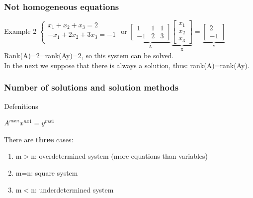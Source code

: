 \begin{frame}
	\frametitle{Not homogeneous equations}
	\begin{block}{Example 2}
		$\begin{cases}
		x_1+x_2+x_3=2\\
		-x_1+2x_2+3x_3=-1\\
		\end{cases}$ or $\underbrace{\begin{bmatrix}
		1 & 1 & 1 \\
		-1 & 2 & 3 \end{bmatrix}}_\text{A} \underbrace{\begin{bmatrix}
		x_1\\
		x_2\\
		x_3
		\end{bmatrix}}_\text{x}=\underbrace{\begin{bmatrix}	2\\-1
		\end{bmatrix}}_\text{y}$\\
		Rank(A)=2=rank(Ay)=2, so this system can be solved.\\
		\vspace{4mm}
		In the next we suppose that there is always a solution, thus: rank(A)=rank(Ay).
	\end{block}
\end{frame}

\begin{frame}
	\frametitle{Number of solutions and solution methods}
	\begin{block}{Defenitions}
		\begin{center}
			$A^{mxn}x^{nx1}=y^{mx1}$
		\end{center}
		There are \textbf{three} cases:
		\begin{enumerate}
			\item m$>$n: overdetermined system (more equations than variables)
			\item m=n: square system
			\item m$<$n: underdetermined system
		\end{enumerate}
	\end{block}
\end{frame}

